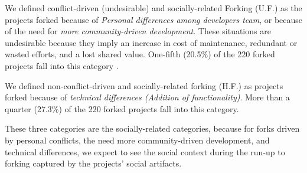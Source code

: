 \documentclass[12pt]{report}
\begin{document}
%

We defined conflict-driven (undesirable) and socially-related Forking (U.F.) as the projects forked because of \textit{Personal differences among developers team}, or because of the need for \textit{more community-driven development}. These situations are undesirable because they imply an increase in cost of maintenance, redundant or wasted efforts, and a lost shared value. One-fifth (20.5\%) of the 220 forked projects fall into this category \cite{Robles}.

We defined non-conflict-driven and socially-related forking (H.F.) as projects forked because of \textit{technical differences (Addition of functionality)}. More than a quarter (27.3\%) of the 220 forked projects fall into this category.

These three categories are the socially-related categories, because for forks driven by personal conflicts, the need more community-driven development, and technical differences, we expect to see the social context during the run-up to forking captured by the projects' social artifacts.
\end{document}
